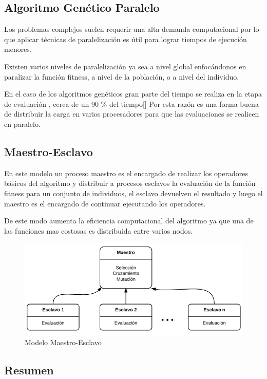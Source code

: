 \subsection{Algoritmo Genético Paralelo}
Los problemas complejos suelen requerir una alta demanda computacional por lo que aplicar técnicas de paralelización es útil para lograr tiempos de ejecución menores.

Existen varios niveles de paralelización ya sea a nivel global enfocándonos en paralizar la función fitness, a nivel de la población, o a nivel del individuo. \citep{Nesmachnow2002}

En el caso de los algoritmos genéticos gran parte del tiempo se realiza en la etapa de evaluación , cerca de un 90 \% del tiempo[]
Por esta razón es una forma buena de distribuir la carga en varios procesadores para que las evaluaciones se realicen en paralelo.


\subsection{Maestro-Esclavo}

En este modelo un proceso maestro es el encargado de realizar los operadores básicos del algoritmo y distribuir a procesos esclavos la evaluación de la función fitness para un conjunto de individuos, el esclavo devuelven el resultado y luego el maestro es el encargado de continuar ejecutando los operadores.

De este modo aumenta la eficiencia computacional del algoritmo ya que una de las funciones mas costosas es distribuida entre varios nodos.

\begin{figure}[H]
\centering
\includegraphics[width=0.7\linewidth]{Figures/diagrama-master-slave}
\caption[Modelo Maestro-Esclavo]{Modelo Maestro-Esclavo}
\label{fig:diagrama-master-slave}
\end{figure}



\subsection{Resumen}




